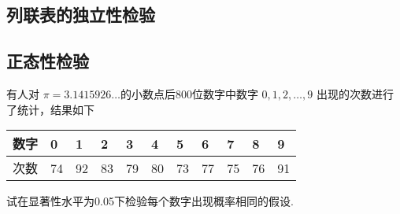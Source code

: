 \subsection{列联表的独立性检验}\label{sec:7.3.2}
\subsection{正态性检验}\label{sec:7.3.3}

\begin{xiti}
	\item 有人对 $\pi =3.1415926\dotsc $的小数点后800位数字中数字 $0,1,2,\dotsc,9$ 出现的次数进行了统计，结果如下
	
	\begin{table}[!htp]
		\centering
\begin{tabularx}{1.0\textwidth}{Z|ZZZZZZZZZZ}
	数字&0&1&2&3&4&5&6&7&8&9\\
			\midrule
	次数&74&92&83&79&80&73&77&75&76&91
		\end{tabularx}
	\end{table}
试在显著性水平为0.05下检验每个数字出现概率相同的假设.
\end{xiti}